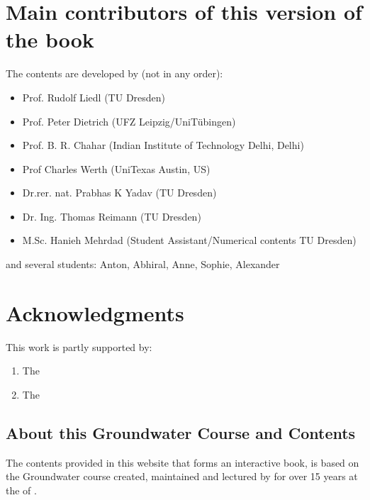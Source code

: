 \documentclass[letterpaper,10pt,english]{sphinxmanual}
\begin{document}
\chapter{Main contributors of this version of the book}
\label{\detokenize{intro:main-contributors-of-this-version-of-the-book}}
The contents are developed by (not in any order):
\begin{itemize}
\item {} 
Prof. Rudolf Liedl (TU Dresden)

\item {} 
Prof. Peter Dietrich (UFZ Leipzig/Uni\sphinxhyphen{}Tübingen)

\item {} 
Prof. B. R. Chahar (Indian Institute of Technology Delhi, Delhi)

\item {} 
Prof Charles Werth (Uni\sphinxhyphen{}Texas Austin, US)

\item {} 
Dr.rer. nat. Prabhas K Yadav (TU Dresden)

\item {} 
Dr. Ing. Thomas Reimann (TU Dresden)

\item {} 
M.Sc. Hanieh Mehrdad (Student Assistant/Numerical contents\sphinxhyphen{} TU Dresden)

\end{itemize}

and several students: Anton, Abhiral, Anne, Sophie, Alexander


\chapter{Acknowledgments}
\label{\detokenize{intro:acknowledgments}}
This work is partly supported by:
\begin{enumerate}
%
\item {} 
The 

\item {} 
The 

\end{enumerate}


\section{About this Groundwater Course and Contents}
\label{\detokenize{contents/background/00_general:about-this-groundwater-course-and-contents}}\label{\detokenize{contents/background/00_general::doc}}
The contents provided in this website that forms an interactive book, is based on the Groundwater course created, maintained and lectured by
 for over 15 years at the  of .
\end{document}
